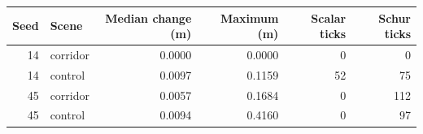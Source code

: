 \begin{tabular}{@{}rlrrrr@{}}
\toprule
Seed & Scene & Median change (m) & Maximum (m) & Scalar ticks & Schur ticks\\\midrule
14 & corridor & 0.0000 & 0.0000 & 0 & 0\\
14 & control & 0.0097 & 0.1159 & 52 & 75\\
45 & corridor & 0.0057 & 0.1684 & 0 & 112\\
45 & control & 0.0094 & 0.4160 & 0 & 97\\
\bottomrule
\end{tabular}
